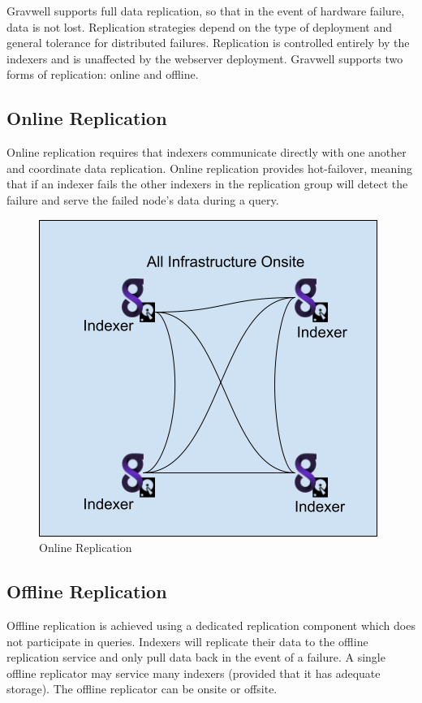 {Gravwell supports full data replication, so that in the event of
hardware failure, data is not lost. Replication strategies depend on
the type of deployment and general tolerance for distributed failures.
Replication is controlled entirely by the indexers and is unaffected by
the webserver deployment. Gravwell supports two forms of replication:
online and offline.

\subsection{Online Replication}

Online replication requires that indexers communicate directly with one
another and coordinate data replication. Online replication provides
hot-failover, meaning that if an indexer fails the other indexers in the
replication group will detect the failure and serve the failed node's
data during a query.

\begin{figure}
	\includegraphics[width=0.6\linewidth]{images/onlinereplication.png}	
	\caption{Online Replication}
	\label{fig:onlinereplication}
\end{figure}


\subsection{Offline Replication}

Offline replication is achieved using a dedicated replication component
which does not participate in queries. Indexers will replicate their
data to the offline replication service and only pull data back in the
event of a failure. A single offline replicator may service many
indexers (provided that it has adequate storage). The offline
replicator can be onsite or offsite.

}
